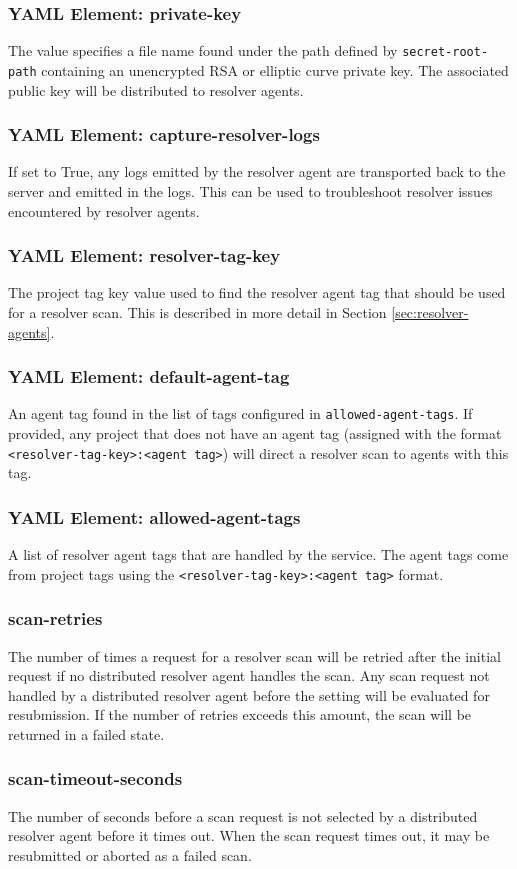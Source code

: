 \subsubsection{YAML Element: private-key}\label{sec:yaml-resolver-private-key}
The value specifies a file name found under the path defined by \texttt{secret-root-path}
containing an unencrypted RSA or elliptic curve private key.  The associated public key will be distributed to
resolver agents.


\subsubsection{YAML Element: capture-resolver-logs}\label{sec:yaml-resolver-capture-resolver-logs}
If set to True, any logs emitted by the resolver agent are transported back to the \cxoneflow server and
emitted in the \cxoneflow logs.  This can be used to troubleshoot resolver issues encountered by resolver
agents.

\subsubsection{YAML Element: resolver-tag-key}\label{sec:yaml-resolver-resolver-tag-key}
The \cxone project tag key value used to find the resolver agent tag that should be used for a resolver scan.
This is described in more detail in Section \ref{sec:resolver-agents}.

\subsubsection{YAML Element: default-agent-tag}\label{sec:yaml-resolver-default-agent-tag}
An agent tag found in the list of tags configured in \texttt{allowed-agent-tags}.  If provided,
any \cxone project that does not have an agent tag (assigned with the format \texttt{<resolver-tag-key>:<agent tag>})
will direct a resolver scan to agents with this tag.

\subsubsection{YAML Element: allowed-agent-tags}\label{sec:yaml-resolver-allowed-agent-tags}
A list of resolver agent tags that are handled by the \cxoneflow service.  The agent tags come from
\cxone project tags using the \texttt{<resolver-tag-key>:<agent tag>} format.  


\subsubsection{scan-retries}\label{sec:resolver-scan-retries}
The number of times a request for a resolver scan will be retried after the initial request if no distributed resolver agent handles the scan.
Any scan request not handled by a distributed resolver agent before the  setting 
will be evaluated for resubmission.  If the number of retries exceeds this amount, the scan will be returned in a failed state.

\subsubsection{scan-timeout-seconds}\label{sec:resolver-scan-timeout-seconds}
The number of seconds before a scan request is not selected by a distributed resolver agent before it times out.  When the scan
request times out, it may be resubmitted or aborted as a failed scan.
